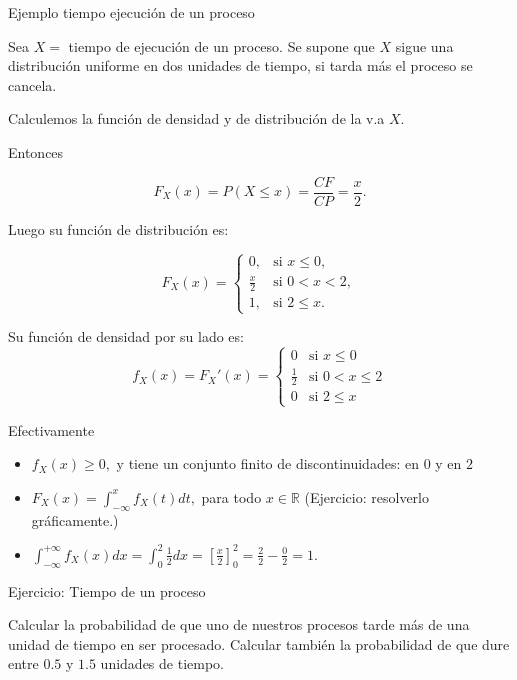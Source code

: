 \documentclass[
  letterpaper,
  DIV=11,
  numbers=noendperiod]{scrreprt}
\providecommand{\tightlist}{%
  \setlength{\itemsep}{0pt}\setlength{\parskip}{0pt}}\usepackage{longtable,booktabs,array}
\begin{document}
\begin{Ejemplo}{Ejemplo tiempo ejecución de un proceso}{}

Sea \(X=\) tiempo de ejecución de un proceso. Se supone que \(X\) sigue
una distribución uniforme en dos unidades de tiempo, si tarda más el
proceso se cancela.

Calculemos la función de densidad y de distribución de la v.a \(X\).

Entonces

\[
F_{X}(x)=P(X\leq x)=\frac{CF}{CP}=\frac{x}2.
\]

Luego su función de distribución es:

\[
F_{X}(x)=\left\{\begin{array}{ll}
0, & \mbox{si } x\leq 0,\\
\frac{x}2 & \mbox{si } 0<x<2,\\
1, & \mbox{si } 2\leq x.
\end{array}\right.
\]

Su función de densidad por su lado es: \[
f_{X}(x)=F_{X}'(x)=\left\{\begin{array}{ll}
0 & \mbox{si } x\leq 0\\
\frac12 & \mbox{si } 0<x\leq 2\\
0 & \mbox{si } 2\leq x
\end{array}\right.
\]

Efectivamente

\begin{itemize}
\tightlist
\item
  \(f_{X}(x)\geq 0,\) y tiene un conjunto finito de discontinuidades: en
  \(0\) y en \(2\)
\item
  \(F_X(x)=\displaystyle\int_{-\infty}^x f_X(t) dt,\) para todo
  \(x\in \mathbb{R}\) (Ejercicio: resolverlo gráficamente.)
\item
  \(\displaystyle\int_{-\infty}^{+\infty}f_{X}(x)dx=
  \int_0^2\frac12dx=\left[\frac{x}2\right]_0^2
  =\frac22-\frac02=1.\)
\end{itemize}

\end{Ejemplo}

\begin{Ejercicio}{Ejercicio: Tiempo de un proceso}{}

Calcular la probabilidad de que uno de nuestros procesos tarde más de
una unidad de tiempo en ser procesado. Calcular también la probabilidad
de que dure entre \(0.5\) y \(1.5\) unidades de tiempo.

\end{Ejercicio}
\end{document}
